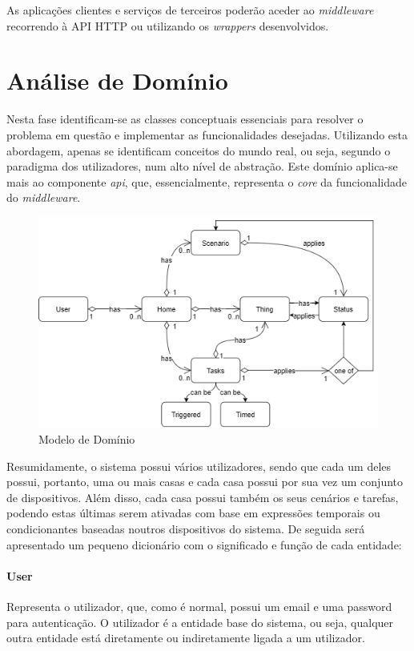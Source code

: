 As aplicações clientes e serviços de terceiros poderão aceder ao \textit{middleware} recorrendo à API HTTP ou utilizando os \textit{wrappers} desenvolvidos.
\section{Análise de Domínio}

Nesta fase identificam-se as classes conceptuais essenciais para resolver o problema em questão e implementar as funcionalidades desejadas. Utilizando esta abordagem, apenas se identificam conceitos do mundo real, ou seja, segundo o paradigma dos utilizadores, num alto nível de abstração. Este domínio aplica-se mais ao componente \textit{api}, que, essencialmente, representa o \textit{core} da funcionalidade do \textit{middleware}.

\begin{figure}[H]
  \centering
        \includegraphics[scale=0.8]{img/domain.png}
  \caption{Modelo de Domínio}
\end{figure}

Resumidamente, o sistema possui vários utilizadores, sendo que cada um deles possui, portanto, uma ou mais casas e cada casa possui por sua vez um conjunto de dispositivos. Além disso, cada casa possui também os seus cenários e tarefas, podendo estas últimas serem ativadas com base em expressões temporais ou condicionantes baseadas noutros dispositivos do sistema. De seguida será apresentado um pequeno dicionário com o significado e função de cada entidade:

\paragraph*{User}
Representa o utilizador, que, como é normal, possui um email e uma password para autenticação. O utilizador é a entidade base do sistema, ou seja, qualquer outra entidade está diretamente ou indiretamente ligada a um utilizador.

